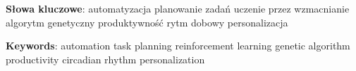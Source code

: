 \textbf{Słowa kluczowe}: \quad automatyzacja  \quad planowanie zadań \quad uczenie przez wzmacnianie \quad algorytm genetyczny \quad produktywność \quad rytm dobowy \quad personalizacja

\noindent\textbf{Keywords}: \quad automation  \quad task planning \quad reinforcement learning \quad genetic algorithm \quad productivity \quad circadian rhythm \quad personalization
